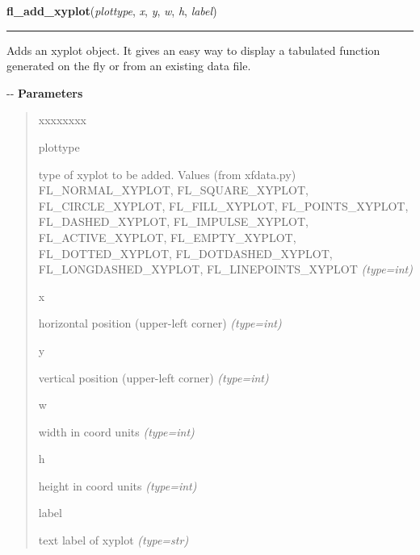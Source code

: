     \vspace{0.5ex}

\hspace{.8\funcindent}\begin{boxedminipage}{\funcwidth}

    \raggedright \textbf{fl\_add\_xyplot}(\textit{plottype}, \textit{x}, \textit{y}, \textit{w}, \textit{h}, \textit{label})

    \vspace{-1.5ex}

    \rule{\textwidth}{0.5\fboxrule}
\setlength{\parskip}{2ex}

Adds an xyplot object. It gives an easy way to display a tabulated
function generated on the fly or from an existing data file.

-{}-
\setlength{\parskip}{1ex}
      \textbf{Parameters}
      \vspace{-1ex}

      \begin{quote}
        \begin{Ventry}{xxxxxxxx}

          \item[plottype]


type of xyplot to be added. Values (from xfdata.py)
FL\_NORMAL\_XYPLOT, FL\_SQUARE\_XYPLOT, FL\_CIRCLE\_XYPLOT,
FL\_FILL\_XYPLOT, FL\_POINTS\_XYPLOT, FL\_DASHED\_XYPLOT,
FL\_IMPULSE\_XYPLOT, FL\_ACTIVE\_XYPLOT, FL\_EMPTY\_XYPLOT,
FL\_DOTTED\_XYPLOT, FL\_DOTDASHED\_XYPLOT, FL\_LONGDASHED\_XYPLOT,
FL\_LINEPOINTS\_XYPLOT
            {\it (type=int)}

          \item[x]


horizontal position (upper-left corner)
            {\it (type=int)}

          \item[y]


vertical position (upper-left corner)
            {\it (type=int)}

          \item[w]


width in coord units
            {\it (type=int)}

          \item[h]


height in coord units
            {\it (type=int)}

          \item[label]


text label of xyplot
            {\it (type=str)}


\end{Ventry}
\end{quote}
\end{boxedminipage}
